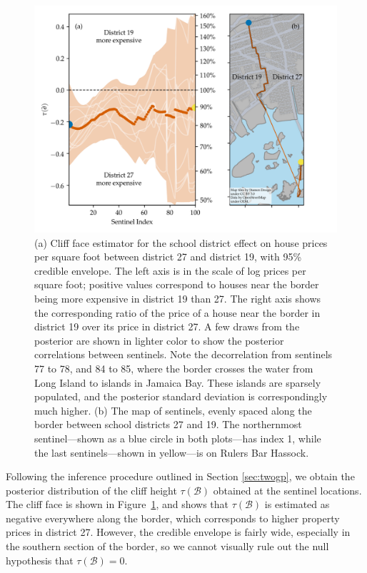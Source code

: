 \documentclass[letter,12pt]{article}
\newcommand{\border}{\mathcal{B}}
\begin{document}
\begin{figure}[tb]
    \centering
    \includegraphics[height=0.4\textheight]{../NYC/NYC_plots/NYC_cliff_face.png}
    \caption{\label{fig:NYC_cliff_face}
        (a)
        Cliff face estimator for the school district effect on house prices per square foot between district 27 and district 19, with 95\% credible envelope.
        The left axis is in the scale of log prices per square foot; positive values correspond to houses near the border being more expensive in district 19 than 27.
        The right axis shows the corresponding ratio of the price of a house near the border in district 19 over its price in district 27.
        A few draws from the posterior are shown in lighter color to show the posterior correlations between sentinels.
        Note the decorrelation from sentinels 77 to 78, and 84 to 85, where the border crosses the water from Long Island to islands in Jamaica Bay.  These islands are sparsely populated, and the posterior standard deviation is correspondingly much higher.
        (b)
        The map of sentinels, evenly spaced along the border between school districts 27 and 19.
    The northernmost sentinel---shown as a blue circle in both plots---has index 1, while the last sentinels---shown in yellow---is on Rulers Bar Hassock.}
\end{figure}

Following the inference procedure outlined in Section \ref{sec:twogp}, we obtain the posterior distribution of the cliff height \(\tau(\border)\) obtained at the sentinel locations.
The cliff face is shown in Figure~\ref{fig:NYC_cliff_face}, and shows that \(\tau(\border)\) is estimated as negative everywhere along the border, which corresponds to higher property prices in district 27.
However, the credible envelope is fairly wide, especially in the southern section of the border, so we cannot visually rule out the null hypothesis that \(\tau(\border)=0\).
\end{document}
